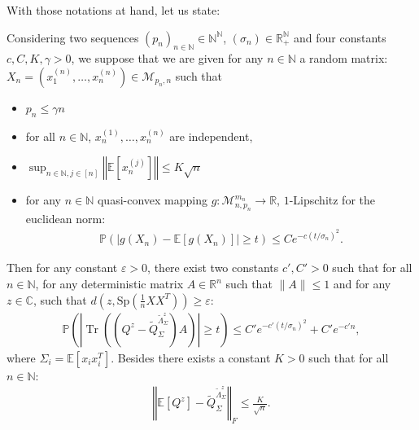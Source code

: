 \documentclass{ws-rmta}
\DeclareMathOperator{\tr}{Tr}
\begin{document}
With those notations at hand, let us state:
\begin{theorem}\label{the:concentration_resolvent_main}
  Considering two sequences $(p_n)_{n\in \mathbb N} \in \mathbb N^{\mathbb N}$, $(\sigma_n) \in \mathbb R_+^{\mathbb N}$ and four constants $c,C,K, \gamma >0$, we suppose that we are given for any $n\in \mathbb N$ a random matrix: $X_n = (x_1^{(n)}, \ldots, x_n^{(n)})\in \mathcal M_{p_n,n}$ such that 
  \begin{itemize}
    \item $p_n \leq \gamma n$
    \item for all $n \in \mathbb N$, $x_n^{(1)}, \ldots, x_n^{(n)}$ are independent,
    \item $\sup_{n \in \mathbb N,j\in [n]} \left\Vert \mathbb E \left[ x_n^{(j)}  \right] \right\Vert \leq K \sqrt n$
    \item for any $n \in \mathbb N$ quasi-convex mapping $g: \mathcal M_{n,p_n}^{m_n} \to \mathbb R$, $1$-Lipschitz for the euclidean norm:
  \begin{align*}
    \mathbb P \left( \left\vert g(X_n) - \mathbb E \left[ g(X_n) \right] \right\vert \geq t\right) \leq C e^{-c(t/\sigma_n)^2}.
  \end{align*}
   \end{itemize} 
  Then for any constant $\varepsilon>0$, there exist two constants $c',C'>0$ such that for all $n \in \mathbb N$, for any deterministic matrix $A \in \mathbb R^n$ such that
  $\|A\| \leq 1$ and for any $z \in \mathbb C$, such that $d(z, \text{Sp}(\frac{1}{n}XX^T)) \geq \varepsilon$:
  \begin{align*}
    \mathbb P \left( \left\vert  \tr \left( \left(Q^z - \tilde Q_\Sigma^{\tilde \Lambda_\Sigma^z} \right) A \right) \right\vert \geq t\right) \leq C' e^{ -c' (t/\sigma_n)^2 }  + C' e^{-c'n},
  \end{align*}
    where $\Sigma_i = \mathbb E[x_ix_i^T]$. Besides there exists a constant $K>0$ such that for all $n \in \mathbb N$:
    \begin{align*}
      \left\Vert \mathbb E [Q^z ] - \tilde Q_\Sigma^{\tilde \Lambda_\Sigma^z} \right\Vert_F \leq \frac{K}{\sqrt n}.
    \end{align*}
\end{theorem}
\end{document}
